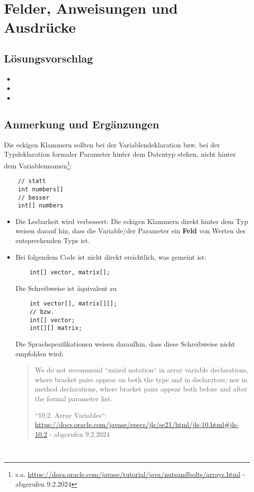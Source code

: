 \chapter{Felder, Anweisungen und Ausdrücke}

\section{Lösungsvorschlag}

\begin{itemize}
    \item {}
    \item {}
    \item {}
\end{itemize}

\section{Anmerkung und Ergänzungen}

Die eckigen Klammern sollten bei der Variablendeklaration {bzw.} bei der Typdeklaration formaler Parameter hinter dem Datentyp stehen, nicht hinter dem Variablennamen\footnote{
    s.a. \url{https://docs.oracle.com/javase/tutorial/java/nutsandbolts/arrays.html} - abgerufen 9.2.2024}:

\begin{verbatim}
    // statt
    int numbers[]
    // besser
    int[] numbers
\end{verbatim}

\begin{itemize}
    \item Die Lesbarkeit wird verbessert: Die eckigen Klammern direkt hinter dem Typ weisen darauf hin, dass die Variable/der Parameter ein \textbf{Feld} von Werten des entsprechenden Typs ist.
    \item Bei folgendem Code ist nicht direkt ersichtlich, was gemeint ist:
    \begin{verbatim}
    int[] vector, matrix[];
    \end{verbatim}
    Die Schreibweise ist äquivalent zu
    \begin{verbatim}
    int vector[], matrix[][];
    // bzw.
    int[] vector;
    int[][] matrix;
    \end{verbatim}
    Die Sprachspezifikationen weisen daraufhin, dass diese Schreibweise nicht empfohlen wird:
    \blockquote[{``10.2. Array Variables``: \url{https://docs.oracle.com/javase/specs/jls/se21/html/jls-10.html#jls-10.2} - abgerufen 9.2.2024}]{
        We do not recommend ``mixed notation`` in array variable declarations, where bracket pairs appear on both the type and in declarators; nor in method declarations, where bracket pairs appear both before and after the formal parameter list.
    }
\end{itemize}\\

